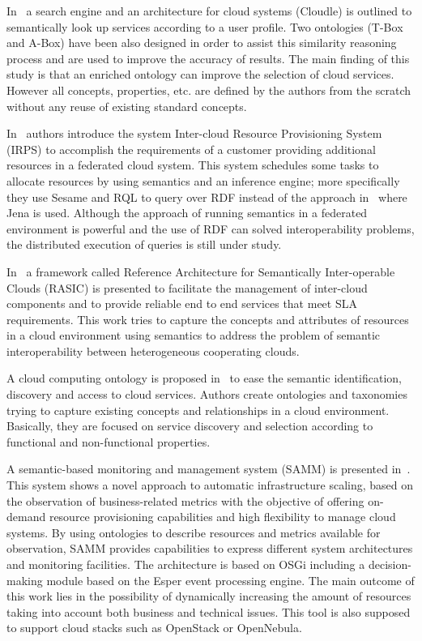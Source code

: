In~\cite{cloudle} a search engine and an architecture for cloud systems (Cloudle) is 
outlined to semantically look up services according to a user profile. Two ontologies (T-Box and A-Box) 
have been also designed in order to assist this similarity reasoning process and are used to 
improve the accuracy of results. The main finding of this study is that an enriched 
ontology can improve the selection of cloud services. However all concepts, 
properties, etc. are defined by the authors from the scratch without any reuse 
of existing standard concepts.

In~\cite{6206823} authors introduce the system Inter-cloud Resource Provisioning System 
(IRPS) to accomplish the requirements of a customer providing additional resources in a federated cloud system. 
This system schedules some tasks to allocate resources by using semantics and an inference engine; 
more specifically they use Sesame and RQL to query over RDF instead of the approach in~\cite{Ejarque:2008:USR:1443230.1444322} 
where Jena is used. Although the approach of running semantics in a federated environment 
is powerful and the use of RDF can solved interoperability problems, the distributed 
execution of queries is still under study.


In~\cite{Buyya:2010:IUF:2143583.2143586} a framework called 
Reference Architecture for Semantically Inter-operable Clouds (RASIC) is presented to facilitate the management of inter-cloud 
components and to provide reliable end to end services that meet SLA requirements. 
This work tries to capture the concepts and attributes of resources in a cloud 
environment using semantics to address the problem of semantic interoperability between heterogeneous cooperating clouds.


A cloud computing ontology is proposed in~\cite{secloud12} to ease the semantic 
identification, discovery and access to cloud services. Authors create ontologies 
and taxonomies trying to capture existing concepts and relationships in a cloud environment. 
Basically, they are focused on service discovery and selection according to 
functional and non-functional properties.

A semantic-based monitoring and management system (SAMM) is presented in~\cite{fg-2266}. 
This system shows a novel approach to automatic infrastructure scaling, based on 
the observation of business-related metrics with the objective of offering 
on-demand resource provisioning capabilities and high flexibility to manage 
cloud systems. By using ontologies to describe resources and metrics available 
for observation, SAMM provides capabilities to express different system architectures 
and monitoring facilities. The architecture is based on OSGi including a decision-making module based 
on the Esper event processing engine. The main outcome of this work lies in the possibility of 
dynamically increasing the amount of resources taking into account both business 
and technical issues. This tool is also supposed to support cloud stacks such 
as OpenStack or OpenNebula.

